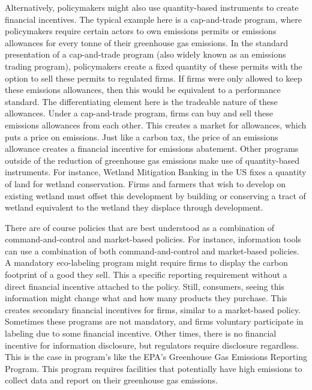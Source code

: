 Alternatively, policymakers might also use quantity-based instruments to create financial incentives. The typical example here is a cap-and-trade program, where policymakers require certain actors to own emissions permits or emissions allowances for every tonne of their greenhouse gas emissions. In the standard presentation of a cap-and-trade program (also widely known as an emissions trading program), policymakers create a fixed quantity of these permits with the option to sell these permits to regulated firms. If firms were only allowed to keep these emissions allowances, then this would be equivalent to a performance standard. The differentiating element here is the tradeable nature of these allowances. Under a cap-and-trade program, firms can buy and sell these emissions allowances from each other. This creates a market for allowances, which puts a price on emissions. Just like a carbon tax, the price of an emissions allowance creates a financial incentive for emissions abatement. Other programs outside of the reduction of greenhouse gas emissions make use of quantity-based instruments. For instance, Wetland Mitigation Banking in the US fixes a quantity of land for wetland conservation. Firms and farmers that wish to develop on existing wetland must offset this development by building or conserving a tract of wetland equivalent to the wetland they displace through development. 

There are of course policies that are best understood as a combination of command-and-control and market-based policies. 
For instance, information tools can use a combination of both command-and-control and market-based policies. A mandatory eco-labeling program might require firms to display the carbon footprint of a good they sell. This a specific reporting requirement without a direct financial incentive attached to the policy. Still, consumers, seeing this information might change what and how many products they purchase. This creates secondary financial incentives for firms, similar to a market-based policy. Sometimes these programs are not mandatory, and firms  voluntary participate in labeling due to some financial incentive. Other times, there is no financial incentive for information disclosure, but regulators require disclosure regardless. This is the case in program's like the EPA's Greenhouse Gas Emissions Reporting Program. This program requires facilities that potentially have high emissions to collect data and report on their greenhouse gas emissions.

